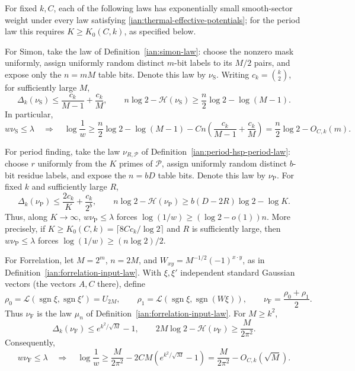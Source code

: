 \begin{proposition}
\label{ian:thermal-three-law-obstructions}
For fixed \(k,C\), each of the following laws has exponentially small
smooth-sector weight under every law satisfying
\eqref{ian:thermal-effective-potentials}; for the period law this
requires \(K\ge K_0(C,k)\), as specified below.

For Simon, take the law of Definition~\ref{ian:simon-law}: choose the
nonzero mask uniformly, assign uniformly random
distinct \(m\)-bit labels to its \(M/2\) pairs, and expose only the
\(n=mM\) table bits. Denote this law by \(\nu_{\mathrm S}\).
Writing \(c_k=\binom{k}{2}\), for sufficiently large \(M\),
\[
 \Delta_k(\nu_{\mathrm S})
 \le\frac{c_k}{M-1}+\frac{c_k}{M},
 \qquad
 n\log2-\mathcal H(\nu_{\mathrm S})
 \ge\frac n2\log2-\log(M-1).
 \tag{36.15}\label{ian:thermal-simon-local-entropy}
\]
In particular,
\[
 w\nu_{\mathrm S}\le\lambda
 \quad\Longrightarrow\quad
 \log\frac1w
 \ge\frac n2\log2-\log(M-1)
 -Cn\left(\frac{c_k}{M-1}+\frac{c_k}{M}\right)
 =\frac n2\log2-O_{C,k}(m).
 \tag{36.16}
\]

For period finding, take the law \(\nu_{R,\mathcal P}\) of
Definition~\ref{ian:period-hsp-period-law}: choose \(r\) uniformly from
the \(K\) primes of \(\mathcal P\), assign uniformly random distinct
\(b\)-bit residue labels, and expose the \(n=bD\) table bits. Denote
this law by \(\nu_{\mathrm P}\). For fixed \(k\) and
sufficiently large \(R\),
\[
 \Delta_k(\nu_{\mathrm P})
 \le\frac{2c_k}{K}+\frac{c_k}{2^b},
 \qquad
 n\log2-\mathcal H(\nu_{\mathrm P})
 \ge b(D-2R)\log2-\log K.
 \tag{36.17}
\]
Thus, along \(K\to\infty\),
\(w\nu_{\mathrm P}\le\lambda\) forces
\(\log(1/w)\ge(\log2-o(1))n\). More precisely, if
\(K\ge K_0(C,k)=\lceil8Cc_k/\log2\rceil\) and \(R\) is sufficiently
large, then \(w\nu_{\mathrm P}\le\lambda\) forces
\(\log(1/w)\ge(n\log2)/2\).

For Forrelation, let \(M=2^m\), \(n=2M\), and
\(W_{xy}=M^{-1/2}(-1)^{x\cdot y}\), as in
Definition~\ref{ian:forrelation-input-law}. With \(\xi,\xi'\)
independent standard Gaussian vectors (the vectors \(A,C\) there),
define
\[
 \rho_0=\mathcal L(\operatorname{sgn}\xi,\operatorname{sgn}\xi')=U_{2M},
 \qquad
 \rho_1=\mathcal L(\operatorname{sgn}\xi,\operatorname{sgn}(W\xi)),
 \qquad
 \nu_{\mathrm F}=\frac{\rho_0+\rho_1}{2}.
 \tag{36.18}
\]
Thus \(\nu_{\mathrm F}\) is the law \(\mu_n\) of
Definition~\ref{ian:forrelation-input-law}.
For \(M\ge k^2\),
\[
 \Delta_k(\nu_{\mathrm F})
 \le e^{k^2/\sqrt M}-1,
 \qquad
 2M\log2-\mathcal H(\nu_{\mathrm F})
 \ge\frac{M}{2\pi^2}.
 \tag{36.19}
\]
Consequently,
\[
 w\nu_{\mathrm F}\le\lambda
 \quad\Longrightarrow\quad
 \log\frac1w
 \ge\frac{M}{2\pi^2}
       -2CM(e^{k^2/\sqrt M}-1)
 =\frac{M}{2\pi^2}-O_{C,k}(\sqrt M).
 \tag{36.20}
\]
\end{proposition}

